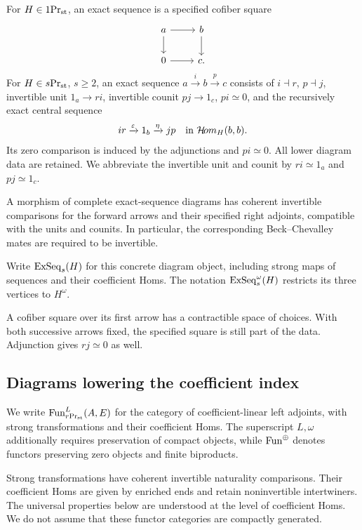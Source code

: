 \begin{definition}\label{def:genuine}
For $H\in{1}\mathrm{Pr}_{\mathrm{st}}$, an exact sequence is a specified cofiber square
\[
 \begin{tikzcd}
 a\ar[r]\ar[d]&b\ar[d]\\
 0\ar[r]&c.
 \end{tikzcd}
\]
For $H\in{s}\mathrm{Pr}_{\mathrm{st}}$, $s\geq2$, an exact sequence
$a\xrightarrow{i}b\xrightarrow{p}c$ consists of $i\dashv r$,
$p\dashv j$, invertible unit $1_a\to ri$, invertible counit
$pj\to1_c$, $pi\simeq0$, and the recursively exact central sequence
\begin{equation}\label{eq:central-row}
 ir\xrightarrow{\varepsilon}1_b\xrightarrow{\eta}jp
       \quad\text{in }\mathcal{H}\!om_H(b,b).
\end{equation}
Its zero comparison is induced by the adjunctions and $pi\simeq0$.
All lower diagram data are retained. We abbreviate the invertible
unit and counit by $ri\simeq1_a$ and $pj\simeq1_c$.

\label{def:exact-sequence-category}
A morphism of complete exact-sequence diagrams has coherent
invertible comparisons for the forward arrows and their
specified right adjoints, compatible with the units and
counits. In particular, the corresponding
Beck--Chevalley mates are required to be invertible.

Write $\operatorname{ExSeq}_s(H)$ for this concrete diagram object, including
strong maps of sequences and their coefficient Homs.
The notation $\operatorname{ExSeq}_s^\omega(H)$ restricts its three vertices to
$H^\omega$.
\end{definition}

A cofiber square over its first arrow has a contractible space of
choices. With both successive arrows fixed, the specified square
is still part of the data. Adjunction gives $rj\simeq0$ as well.

\subsection{Diagrams lowering the coefficient index}


We write $\operatorname{Fun}^L_{{r}\mathrm{Pr}_{\mathrm{st}}}(A,E)$ for the category of
coefficient-linear left adjoints, with strong transformations
and their coefficient Homs. The superscript $L,\omega$
additionally requires preservation of compact objects, while
$\operatorname{Fun}^\oplus$ denotes functors preserving zero objects and
finite biproducts.

Strong transformations have coherent invertible naturality
comparisons. Their coefficient Homs are given by enriched
ends and retain noninvertible intertwiners. The universal
properties below are understood at the level of coefficient
Homs. We do not assume that these functor categories are
compactly generated.



